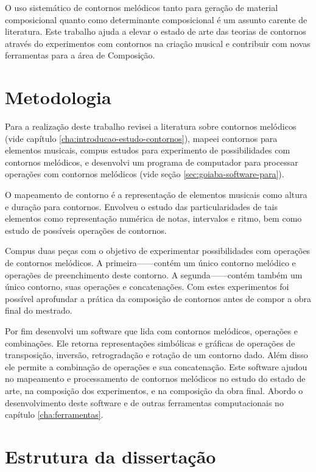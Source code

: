 O uso sistemático de contornos melódicos tanto para geração de
material composicional quanto como determinante composicional é um
assunto carente de literatura. Este trabalho ajuda a elevar o estado
de arte das teorias de contornos através do experimentos com contornos
na criação musical e contribuir com novas ferramentas para a área de
Composição.

\section{Metodologia}
\label{sec:metodologia}

Para a realização deste trabalho revisei a literatura sobre contornos
melódicos (vide capítulo \ref{cha:introducao-estudo-contornos}),
mapeei contornos para elementos musicais, compus estudos para
experimento de possibilidades com contornos melódicos, e desenvolvi um
programa de computador para processar operações com contornos
melódicos (vide seção \ref{sec:goiaba-software-para}).

O mapeamento de contorno é a representação de elementos musicais como
altura e duração para contornos. Envolveu o estudo das
particularidades de tais elementos como representação numérica de
notas, intervalos e ritmo, bem como estudo de possíveis operações de
contornos.

Compus duas peças com o objetivo de experimentar possibilidades com
operações de contornos melódicos. A primeira------contém um único contorno
melódico e operações de preenchimento deste contorno. A
segunda------contém também um único
contorno, suas operações e concatenações. Com estes experimentos foi
possível aprofundar a prática da composição de contornos antes de
compor a obra final do mestrado.

Por fim desenvolvi um software que lida com contornos melódicos,
operações e combinações. Ele retorna representações simbólicas e
gráficas de operações de transposição, inversão, retrogradação e
rotação de um contorno dado. Além disso ele permite a combinação de
operações e sua concatenação. Este software ajudou no mapeamento e
processamento de contornos melódicos no estudo do estado de arte, na
composição dos experimentos, e na composição da obra final. Abordo o
desenvolvimento deste software e de outras ferramentas computacionais
no capítulo \ref{cha:ferramentas}.

\section{Estrutura da dissertação}
\label{sec:estr-da-diss}

